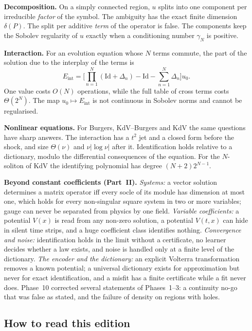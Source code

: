 \documentclass[11pt]{article}
\theoremstyle{plain}
\theoremstyle{definition}
\theoremstyle{remark}
\newcommand{\Id}{\mathrm{Id}}
\newcommand{\Eint}{E_{\mathrm{int}}}        %
\begin{document}
\textbf{Decomposition.} On a simply connected region, $u$ splits into one component per irreducible \emph{factor} of the symbol. The ambiguity has the exact finite dimension $\delta(P)$. The split per additive \emph{term} of the operator is false. The components keep the Sobolev regularity of $u$ exactly when a conditioning number $\gamma_N$ is positive.

\textbf{Interaction.} For an evolution equation whose $N$ terms commute, the part of the solution due to the interplay of the terms is
\[
\Eint=\Big[\prod_{n=1}^N(\Id+\Delta_n)-\Id-\sum_{n=1}^N\Delta_n\Big]u_0 .
\]
One value costs $O(N)$ operations, while the full table of cross terms costs $\Theta(2^N)$. The map $u_0\mapsto\Eint$ is not continuous in Sobolev norms and cannot be regularised.

\textbf{Nonlinear equations.} For Burgers, KdV--Burgers and KdV the same questions have sharp answers. The interaction has a $t^2$ jet and a closed form before the shock, and size $\Theta(\nu)$ and $\nu|\log\nu|$ after it. Identification holds relative to a dictionary, modulo the differential consequences of the equation. For the $N$-soliton of KdV the identifying polynomial has degree $(N+2)2^{N-1}$.

\textbf{Beyond constant coefficients (Part~II).} \emph{Systems:} a vector solution determines a matrix operator iff every socle of its module has dimension at most one, which holds for every non-singular square system in two or more variables; gauge can never be separated from physics by one field. \emph{Variable coefficients:} a potential $V(x)$ is read from any non-zero solution, a potential $V(t,x)$ can hide in silent time strips, and a huge coefficient class identifies nothing. \emph{Convergence and noise:} identification holds in the limit without a certificate, no learner decides whether a law exists, and noise is handled only at a finite level of the dictionary. \emph{The encoder and the dictionary:} an explicit Volterra transformation removes a known potential; a universal dictionary exists for approximation but never for exact identification, and a misfit has a finite certificate while a fit never does. Phase~10 corrected several statements of Phases~1--3: a continuity no-go that was false as stated, and the failure of density on regions with holes.

\subsection*{How to read this edition}
\end{document}
